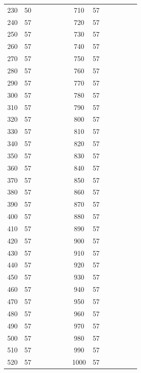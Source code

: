 \documentclass[11pt,a4paper]{article}
\begin{document}
\begin{table}[H]
\begin{tabular}{|c|c|p{0.75cm}|p{0.75cm}|p{0.75cm}|p{0.75cm}|p{0.95cm}||c|c|p{0.75cm}|p{0.75cm}|p{0.75cm}|p{0.75cm}|p{0.95cm}|}
    230 & 50 &  &  &  &  &  & 710 & 57 &  &  &  &  &  \\
    240 & 57 &  &  &  &  &  & 720 & 57 &  &  &  &  &  \\
    250 & 57 &  &  &  &  &  & 730 & 57 &  &  &  &  &  \\
    260 & 57 &  &  &  &  &  & 740 & 57 &  &  &  &  &  \\
    270 & 57 &  &  &  &  &  & 750 & 57 &  &  &  &  &  \\
    280 & 57 &  &  &  &  &  & 760 & 57 &  &  &  &  &  \\
    290 & 57 &  &  &  &  &  & 770 & 57 &  &  &  &  &  \\
    300 & 57 &  &  &  &  &  & 780 & 57 &  &  &  &  &  \\
    310 & 57 &  &  &  &  &  & 790 & 57 &  &  &  &  &  \\
    320 & 57 &  &  &  &  &  & 800 & 57 &  &  &  &  &  \\
    330 & 57 &  &  &  &  &  & 810 & 57 &  &  &  &  &  \\
    340 & 57 &  &  &  &  &  & 820 & 57 &  &  &  &  &  \\
    350 & 57 &  &  &  &  &  & 830 & 57 &  &  &  &  &  \\
    360 & 57 &  &  &  &  &  & 840 & 57 &  &  &  &  &  \\
    370 & 57 &  &  &  &  &  & 850 & 57 &  &  &  &  &  \\
    380 & 57 &  &  &  &  &  & 860 & 57 &  &  &  &  &  \\
    390 & 57 &  &  &  &  &  & 870 & 57 &  &  &  &  &  \\
    400 & 57 &  &  &  &  &  & 880 & 57 &  &  &  &  &  \\
    410 & 57 &  &  &  &  &  & 890 & 57 &  &  &  &  &  \\
    420 & 57 &  &  &  &  &  & 900 & 57 &  &  &  &  &  \\
    430 & 57 &  &  &  &  &  & 910 & 57 &  &  &  &  &  \\
    440 & 57 &  &  &  &  &  & 920 & 57 &  &  &  &  &  \\
    450 & 57 &  &  &  &  &  & 930 & 57 &  &  &  &  &  \\
    460 & 57 &  &  &  &  &  & 940 & 57 &  &  &  &  &  \\
    470 & 57 &  &  &  &  &  & 950 & 57 &  &  &  &  &  \\
    480 & 57 &  &  &  &  &  & 960 & 57 &  &  &  &  &  \\
    490 & 57 &  &  &  &  &  & 970 & 57 &  &  &  &  &  \\
    500 & 57 &  &  &  &  &  & 980 & 57 &  &  &  &  &  \\
    510 & 57 &  &  &  &  &  & 990 & 57 &  &  &  &  &  \\
    520 & 57 &  &  &  &  &  & 1000 & 57 &  &  &  &  &  \\
    \hline
  \end{tabular}
\end{table}
\endgroup
\end{document}
